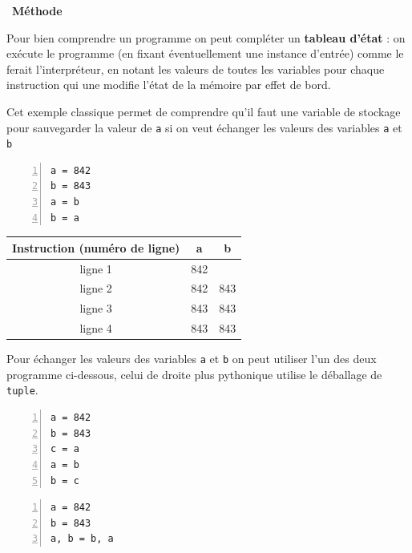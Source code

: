 \documentclass[a4paper, french, 12pt]{article}  %
\newcounter{prog}
\newenvironment{methode}[1]
{\par \medskip    \noindent  
 \begin {bclogo}[arrondi =0.1,logo=\bcoutil, marge=4,noborder = true] {~\textbf{Méthode}   {\itshape #1} }  \par}
{
\end{bclogo}
 \par \bigskip }
\begin{document}
\begin{methode}{}

Pour bien comprendre un programme on peut compléter un \textbf{tableau d'état} : on exécute le programme (en fixant éventuellement une instance d'entrée) comme le ferait l'interpréteur, en notant les valeurs de toutes les variables pour chaque instruction qui  une modifie  l'état de la mémoire par effet de bord.

Cet exemple classique permet de comprendre qu'il faut une variable de stockage pour sauvegarder la valeur de \texttt{a} si on veut échanger les valeurs des variables \texttt{a} et \texttt{b}

\begin{minipage}{0.4\linewidth}
\begin{lstlisting}[style=rond, numbers = left]
a = 842
b = 843
a = b
b = a
\end{lstlisting}
\end{minipage}\hfill
\begin{minipage}{0.55\linewidth}
\begin{tabular}{|c|c|c|}
\hline 
Instruction (numéro de ligne) & a & b \\ 
\hline 
ligne 1 & 842 &  \\ 
\hline 
ligne 2 & 842 & 843 \\ 
\hline 
ligne 3 & 843 & 843 \\ 
\hline 
ligne 4 & 843 & 843 \\ 
\hline 
\end{tabular} 
\end{minipage}

Pour échanger les valeurs des variables \texttt{a} et \texttt{b} on peut utiliser l'un des deux programme ci-dessous, celui de droite  plus pythonique utilise le déballage de \texttt{tuple}.


\medskip

\begin{minipage}{0.4\linewidth}
\begin{lstlisting}[style=rond, numbers = left]
a = 842
b = 843
c = a
a = b
b = c
\end{lstlisting}
\end{minipage}\hfill
\begin{minipage}{0.4\linewidth}
\begin{lstlisting}[style=rond, numbers = left]
a = 842
b = 843
a, b = b, a
\end{lstlisting}
\end{minipage}

\end{methode}
\end{document}
